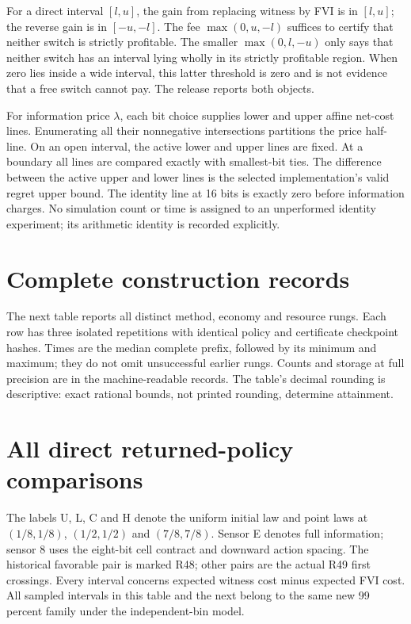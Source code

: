 \documentclass[ecta,nameyear,draft]{econsocart}
\begin{document}
For a direct interval $[l,u]$, the gain from replacing witness by FVI is in $[l,u]$; the reverse gain is in $[-u,-l]$. The fee $\max(0,u,-l)$ suffices to certify that neither switch is strictly profitable. The smaller $\max(0,l,-u)$ only says that neither switch has an interval lying wholly in its strictly profitable region. When zero lies inside a wide interval, this latter threshold is zero and is not evidence that a free switch cannot pay. The release reports both objects.

For information price $\lambda$, each bit choice supplies lower and upper affine net-cost lines. Enumerating all their nonnegative intersections partitions the price half-line. On an open interval, the active lower and upper lines are fixed. At a boundary all lines are compared exactly with smallest-bit ties. The difference between the active upper and lower lines is the selected implementation's valid regret upper bound. The identity line at 16 bits is exactly zero before information charges. No simulation count or time is assigned to an unperformed identity experiment; its arithmetic identity is recorded explicitly.




\section{Complete construction records}\label{supp:records49}
The next table reports all distinct method, economy and resource rungs. Each row has three isolated repetitions with identical policy and certificate checkpoint hashes. Times are the median complete prefix, followed by its minimum and maximum; they do not omit unsuccessful earlier rungs. Counts and storage at full precision are in the machine-readable records. The table's decimal rounding is descriptive: exact rational bounds, not printed rounding, determine attainment.


\section{All direct returned-policy comparisons}\label{supp:direct49}
The labels U, L, C and H denote the uniform initial law and point laws at $(1/8,1/8)$, $(1/2,1/2)$ and $(7/8,7/8)$. Sensor E denotes full information; sensor 8 uses the eight-bit cell contract and downward action spacing. The historical favorable pair is marked R48; other pairs are the actual R49 first crossings. Every interval concerns expected witness cost minus expected FVI cost. All sampled intervals in this table and the next belong to the same new 99 percent family under the independent-bin model.

\end{document}
